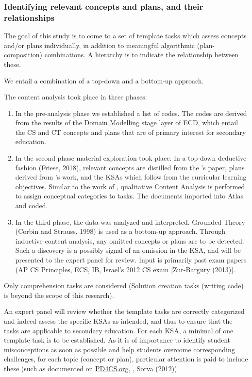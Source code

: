 \subsubsection*{Identifying relevant concepts and plans, and their relationships}
The goal of this study is to come to a set of template tasks which assess concepts and/or plans individually, in addition to meaningful algorithmic (plan-composition) combinations. A hierarchy is to indicate the relationship between these.




We entail a combination of a top-down and a bottom-up approach.

The content analysis took place in three phases:
\begin{enumerate}
\item In the pre-analysis phase we established a list of codes. The codes are derived from the results of the Domain Modelling stage layer of ECD, which entail the CS and CT concepts and plans that are of primary interest for secondary education.

\item In the second phase material exploration took place. In a top-down deductive fashion (Friese, 2018), relevant concepts are distilled from the \citeauthor{LuxtonReilly2018}'s paper, plans derived from \citeauthor{deRaadt2009teachingPlans}'s work, and the KSAs which follow from the curricular learning objectives. Similar to the work of \citeauthor{LuxtonReilly2018}, qualitative Content Analysis is performed to assign conceptual categories to tasks. The documents imported into Atlas and coded.

\item In the third phase, the data was analyzed and interpreted. Grounded Theory (Corbin and Strauss, 1998) is used as a bottom-up approach. Through inductive content analysis, any omitted concepts or plans are to be detected. Such a discovery is a possibly signal of an omission in the KSA, and will be presented to the expert panel for review. Input is primarily past exam papers (AP CS Principles, ECS, IB, Israel's 2012 CS exam [Zur-Bargury (2013)].


\end{enumerate}


Only comprehension tasks are considered (Solution creation tasks (writing code) is beyond the scope of this research).

An expert panel will review whether the template tasks are correctly categorized and indeed assess the specific KSAs as intended, and thus to ensure that the tasks are applicable to secondary education. For each KSA, a minimal of one template task is to be established. As it is of importance to identify student misconceptions as soon as possible and help students overcome corresponding challenges, for each topic (concept or plan), particular attention is paid to include these (such as documented on \url{PD4CS.org}, \cite{grover2017measuring}, Sorva (2012)).

